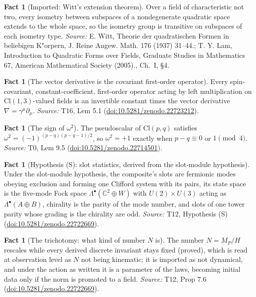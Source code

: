 \documentclass[11pt]{article}
\theoremstyle{definition}
\newtheorem{fact}[theorem]{Fact}
\theoremstyle{plain}
\providecommand{\C}{}\renewcommand{\C}{\mathbb{C}}
\providecommand{\Cl}{}\renewcommand{\Cl}{\mathrm{Cl}}
\begin{document}
\begin{fact}[Imported: Witt's extension theorem]\label{c:one-relation.imported-witts-extension-theorem}
Over a field of characteristic not two, every isometry between subspaces of a nondegenerate quadratic space extends to the whole space, so the isometry group is transitive on subspaces of each isometry type.
\emph{Source:} E. Witt, Theorie der quadratischen Formen in beliebigen K"orpern, J. Reine Angew. Math. 176 (1937) 31--44.; T. Y. Lam, Introduction to Quadratic Forms over Fields, Graduate Studies in Mathematics 67, American Mathematical Society (2005)., Ch.~I, \S4.
\end{fact}

\begin{fact}[The vector derivative is the covariant first-order operator]\label{c:one-relation.vector-derivative-covariant-first-order-operator}
Every spin-covariant, constant-coefficient, first-order operator acting by left multiplication on $\Cl(1,3)$-valued fields is an invertible constant times the vector derivative $\nabla = \gamma^{\mu}\partial_{\mu}$.
\emph{Source:} T16, Lem 5.1 (\href{https://doi.org/10.5281/zenodo.22723212}{doi:10.5281/zenodo.22723212}).
\end{fact}

\begin{fact}[The sign of $\omega^2$]\label{c:primer.sign}
The pseudoscalar of $\Cl(p,q)$ satisfies $\omega^{2} = (-1)^{(p-q)(p-q-1)/2}$, so $\omega^{2} = +1$ exactly when $p - q \equiv 0$ or $1 \pmod 4$.
\emph{Source:} T0, Lem 9.5 (\href{https://doi.org/10.5281/zenodo.22714501}{doi:10.5281/zenodo.22714501}).
\end{fact}

\begin{fact}[Hypothesis (S): slot statistics, derived from the slot-module hypothesis]\label{c:standard-model.hyp-s-slot-statistics}
Under the slot-module hypothesis, the composite's slots are fermionic modes obeying exclusion and forming one Clifford system with its pairs, its state space is the five-mode Fock space $\Lambda^{\bullet}(\C^{2} \oplus W)$ with $U(2) \times U(3)$ acting as $\Lambda^{\bullet}(A \oplus B)$, chirality is the parity of the mode number, and slots of one tower parity whose grading is the chirality are odd.
\emph{Source:} T12, Hypothesis (S) (\href{https://doi.org/10.5281/zenodo.22722669}{doi:10.5281/zenodo.22722669}).
\end{fact}

\begin{fact}[The trichotomy: what kind of number $N$ is]\label{c:standard-model.trichotomy-what-kind-number}
The number $N = M_{P}/H$ rescales while every derived discrete invariant stays fixed (proved), which is read at observation level as $N$ not being kinematic; it is imported as not dynamical, and under the action as written it is a parameter of the laws, becoming initial data only if the norm is promoted to a field.
\emph{Source:} T12, Prop 7.6 (\href{https://doi.org/10.5281/zenodo.22722669}{doi:10.5281/zenodo.22722669}).
\end{fact}
\end{document}
